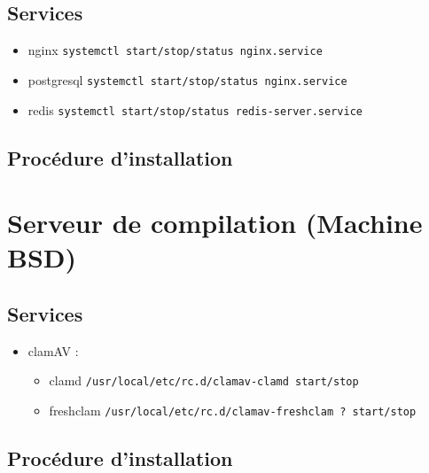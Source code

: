 \documentclass[10pt,a4paper]{article}
\begin{document}
\subsection{Services}
\begin{itemize}
    \item nginx \texttt{systemctl start/stop/status nginx.service}
    \item postgresql \texttt{systemctl start/stop/status nginx.service}
    \item redis \texttt{systemctl start/stop/status redis-server.service}
\end{itemize}

\subsection{Procédure d'installation}


\section{Serveur de compilation (Machine BSD)}
\subsection{Services}
\begin{itemize}
    \item clamAV :
        \begin{itemize}
            \item clamd \texttt{/usr/local/etc/rc.d/clamav-clamd start/stop}
            \item freshclam \texttt{/usr/local/etc/rc.d/clamav-freshclam ? start/stop}
        \end{itemize}
\end{itemize}

\subsection{Procédure d'installation}
\end{document}
